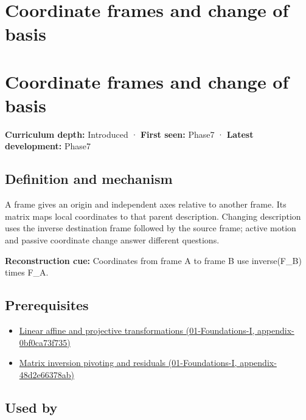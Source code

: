 \hypertarget{appendix-1bae9457dbc3}{}
\section*{Coordinate frames and change of basis}
\section{Coordinate frames and change of basis}\label{appendix-1bae9457dbc3-coordinate-frames-and-change-of-basis}

\textbf{Curriculum depth:} Introduced · \textbf{First seen:} Phase7 · \textbf{Latest development:} Phase7

\subsection{Definition and mechanism}\label{appendix-1bae9457dbc3-definition-and-mechanism}

A frame gives an origin and independent axes relative to another frame. Its matrix maps local coordinates to that parent description. Changing description uses the inverse destination frame followed by the source frame; active motion and passive coordinate change answer different questions.

\textbf{Reconstruction cue:} Coordinates from frame A to frame B use inverse(F\_B) times F\_A.

\subsection{Prerequisites}\label{appendix-1bae9457dbc3-prerequisites}

\begin{itemize}
\tightlist
\item
  \href{../01-Foundations-I/main.pdf\#nameddest=appendix-0bf0ca73f735}{Linear affine and projective transformations (01-Foundations-I, appendix-0bf0ca73f735)}
\item
  \href{../01-Foundations-I/main.pdf\#nameddest=appendix-48d2e66378ab}{Matrix inversion pivoting and residuals (01-Foundations-I, appendix-48d2e66378ab)}
\end{itemize}

\subsection{Used by}\label{appendix-1bae9457dbc3-used-by}

